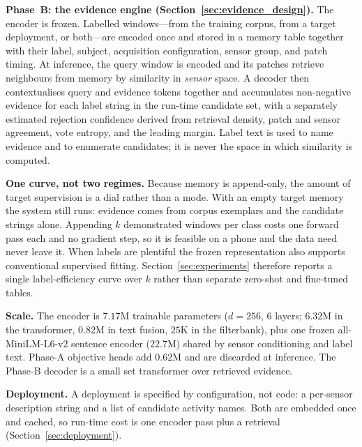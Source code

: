 \textbf{Phase~B: the evidence engine (Section~\ref{sec:evidence_design}).}
The encoder is frozen. Labelled windows---from the training corpus, from a target deployment,
or both---are encoded once and stored in a memory table together with their label, subject,
acquisition configuration, sensor group, and patch timing. At inference, the query window is
encoded and its patches retrieve neighbours from memory by similarity in \emph{sensor} space.
A decoder then contextualises query and evidence tokens together and accumulates non-negative
evidence for each label string in the run-time candidate set, with a separately estimated
rejection confidence derived from retrieval density, patch and sensor agreement, vote entropy,
and the leading margin. Label text is used to name evidence and to enumerate candidates; it is
never the space in which similarity is computed.

\textbf{One curve, not two regimes.} Because memory is append-only, the amount of target
supervision is a dial rather than a mode. With an empty target memory the system still runs:
evidence comes from corpus exemplars and the candidate strings alone. Appending $k$ demonstrated
windows per class costs one forward pass each and no gradient step, so it is feasible on a phone
and the data need never leave it. When labels are plentiful the frozen representation also
supports conventional supervised fitting. Section~\ref{sec:experiments} therefore reports a
single label-efficiency curve over $k$ rather than separate zero-shot and fine-tuned tables.

\textbf{Scale.} The encoder is $7.17$M trainable parameters ($d{=}256$, $6$ layers; $6.32$M in
the transformer, $0.82$M in text fusion, $25$K in the filterbank), plus one frozen
all-MiniLM-L6-v2 sentence encoder ($22.7$M) shared by sensor conditioning and label text.
Phase-A objective heads add $0.62$M and are discarded at inference. The Phase-B decoder is a
small set transformer over retrieved evidence.

\textbf{Deployment.} A deployment is specified by configuration, not code: a per-sensor
description string and a list of candidate activity names. Both are embedded once and cached, so
run-time cost is one encoder pass plus a retrieval (Section~\ref{sec:deployment}).
